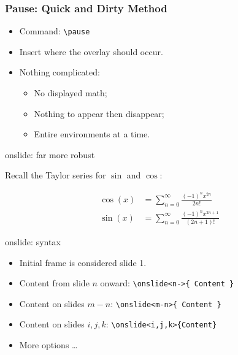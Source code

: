 \documentclass{beamer}
\begin{document}
\begin{frame}[fragile]\frametitle{Pause: Quick and Dirty Method}

\vfill
\begin{itemize}
  \item Command: \verb#\pause# 
  \pause
  \vfill
  \item Insert where the overlay should occur.  \pause
  \vfill 
  \item Nothing complicated:\vfill  \pause
  \begin{itemize}
    \item No displayed math;\vfill  \pause
    \item Nothing to appear then disappear;\vfill  \pause
    \item Entire environments at a time.\vfill  
  \end{itemize}
\end{itemize} %

\end{frame}

\begin{frame}{onslide: far more robust}

Recall the Taylor series for $\sin$ and $\cos$:

\begin{align*}
  \cos(x) & = \sum_{n=0}^\infty \frac{(-1)^nx^{2n}}{2n!} \\
  \sin(x) & = \sum_{n=0}^\infty \frac{(-1)^nx^{2n+1}}{(2n+1)!} 
\end{align*}

\onslide<2->{If $x=i \theta $ where $i^2 = -1$, then:
\begin{align*}
\onslide<3->{  \cos(i\theta) & = \sum_{n=0}^\infty \frac{(-1)^n(i\theta)^{2n}}{2n!} 
\onslide<4->{ = \sum_{n=0}^\infty\frac{(-1)^n(-1)^n\theta^{2n}}{2n!} 
 = \sum_{n=0}^\infty\frac{\theta^{2n}}{2n!} \\
}
  }
\end{align*} }

\end{frame}

\begin{frame}[fragile]{onslide: syntax}

\vfill
\begin{itemize}
  \item Initial frame is considered slide 1.\vfill
  \item Content from slide $n$ onward: \verb#\onslide<n->{ Content }#\vfill
  \item Content on slides $m-n$: \verb#\onslide<m-n>{ Content }#\vfill
  \item Content on slides $i,j,k$: \verb#\onslide<i,j,k>{Content}#\vfill
  \item More options \ldots 
\end{itemize}


\end{frame}
\end{document}
